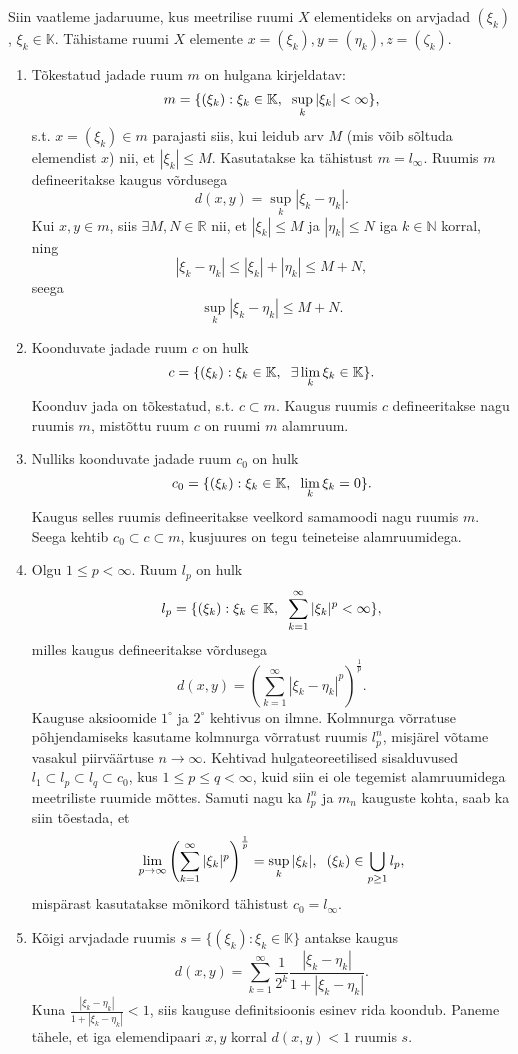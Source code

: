 \documentclass{article}[12pt]
\newcommand{\h}{\hspace{0.2cm}}
\newcommand{\R}{\mathbb{R}}
\newcommand{\N}{\mathbb{N}}
\newcommand{\K}{\mathbb{K}}
\theoremstyle{definition}
\theoremstyle{definition}
\theoremstyle{definition}
\begin{document}
Siin vaatleme jadaruume, kus meetrilise ruumi $X$ elementideks on arvjadad $(\xi_k)$, $\xi_k\in\K$.
Tähistame ruumi $X$ elemente $x=(\xi_k),y=(\eta_k),z=(\zeta_k)$.
\begin{enumerate}
	\item Tõkestatud jadade ruum $m$ on hulgana kirjeldatav:
	\[
		m=\{ (\xi_k):\xi_k\in\K,\h\sup_k |\xi_k|<\infty \},
	\]
	s.t. $x=(\xi_k)\in m$ parajasti siis, kui leidub arv $M$ (mis võib sõltuda elemendist $x$) nii, et $|\xi_k|\leq M$.
	Kasutatakse ka tähistust $m=l_\infty$.
	Ruumis $m$ defineeritakse kaugus võrdusega
	\[
		d(x,y) = \sup_k |\xi_k-\eta_k|.
	\]
	Kui $x,y\in m$, siis $\exists M,N\in\R$ nii, et $|\xi_k|\leq M$ ja $|\eta_k|\leq N$ iga $k\in\N$ korral, ning
	\[
		|\xi_k-\eta_k|\leq |\xi_k|+|\eta_k|\leq M+N,
	\]
	seega
	\[
		\sup_k |\xi_k-\eta_k| \leq M+N.
	\]
	\item Koonduvate jadade ruum $c$ on hulk
	\[
		c=\{ (\xi_k):\xi_k\in\K,\h\exists\lim_k \xi_k\in\K \}.
	\]
	Koonduv jada on tõkestatud, s.t. $c\subset m$.
	Kaugus ruumis $c$ defineeritakse nagu ruumis $m$, mistõttu ruum $c$ on ruumi $m$ alamruum.
	\item Nulliks koonduvate jadade ruum $c_0$ on hulk
	\[
		c_0= \{ (\xi_k):\xi_k\in\K,\h\lim_k\xi_k = 0 \}.
	\]
	Kaugus selles ruumis defineeritakse veelkord samamoodi nagu ruumis $m$.
	Seega kehtib $c_0\subset c\subset m$, kusjuures on tegu teineteise alamruumidega.
	\item Olgu $1\leq p < \infty$. 
	Ruum $l_p$ on hulk
	\[
		l_p = \{ (\xi_k):\xi_k\in\K,\h \sum_{k=1}^\infty |\xi_k|^p < \infty \},
	\]
	milles kaugus defineeritakse võrdusega
	\[
		d(x,y) = \left( \sum_{k=1}^\infty |\xi_k-\eta_k|^p \right)^{\frac{1}{p}}.
	\]
	Kauguse aksioomide $1^\circ$ ja $2^\circ$ kehtivus on ilmne.
	Kolmnurga võrratuse põhjendamiseks kasutame kolmnurga võrratust ruumis $l_p^n$, misjärel võtame vasakul piirväärtuse $n\rightarrow \infty$.
	Kehtivad hulgateoreetilised sisalduvused $l_1\subset l_p \subset l_q \subset c_0$, kus $1\leq p \leq q < \infty$, kuid siin ei ole tegemist alamruumidega meetriliste ruumide mõttes.
	Samuti nagu ka $l_p^n$ ja $m_n$ kauguste kohta, saab ka siin tõestada, et
	\[
		\lim_{p\rightarrow \infty} \left( \sum_{k=1}^\infty |\xi_k|^p \right)^{\frac{1}{p}} = \sup_k |\xi_k|,\h (\xi_k)\in \bigcup_{p\geq 1} l_p,
	\]
	mispärast kasutatakse mõnikord tähistust $c_0=l_\infty$.
	\item Kõigi arvjadade ruumis $s = \{ (\xi_k):\xi_k\in \K \}$ antakse kaugus
	\[
		d(x,y) = \sum_{k=1}^\infty \frac{1}{2^k} \frac{ |\xi_k-\eta_k| }{1 + |\xi_k-\eta_k| }.
	\]
	Kuna $\frac{ |\xi_k-\eta_k| }{1 + |\xi_k-\eta_k| } < 1$, siis kauguse definitsioonis esinev rida koondub. Paneme tähele, et iga elemendipaari $x,y$ korral $d(x,y)<1$ ruumis $s$.


\end{enumerate}
\end{document}
